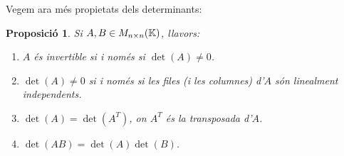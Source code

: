\documentclass[
  11pt,
]{book}
\numberwithin{dummy}{section}
\theoremstyle{maincolornumbox}
\theoremstyle{blacknumex}
\theoremstyle{blacknumbox}
\theoremstyle{maincolornum}
\newtheorem{propositionT}{Proposició}[chapter]
\newenvironment{proposition}{\begin{pBox}\begin{propositionT}}{\end{propositionT}\end{pBox}}
\begin{document}
Vegem ara més propietats dels determinants:

\begin{proposition}

Si \(A, B\in M_{n\times n}(\mathbb{K})\), llavors:

\begin{enumerate}
\def\labelenumi{\arabic{enumi}.}
\item
  \(A\) és invertible si i només si \(\det(A)\neq 0\).
\item
  \(\det(A)\neq 0\) si i només si les files (i les columnes) d'\(A\) són
  linealment independents.
\item
  \(\det(A)=\det(A^T)\), on \(A^T\) és la transposada d'\(A\).
\item
  \(\det(AB)=\det(A)\det(B)\).
\end{enumerate}

\end{proposition}
\end{document}
